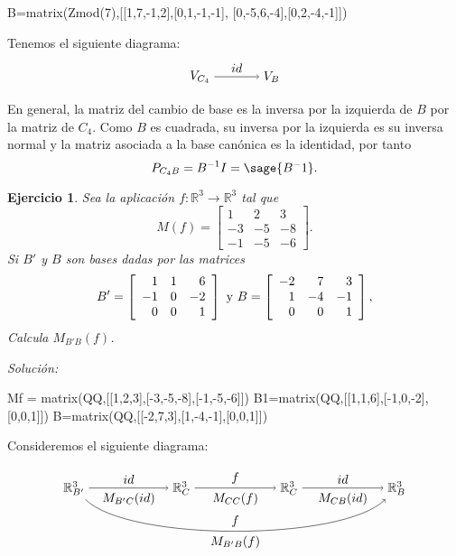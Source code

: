 \documentclass{amsart}
\newtheorem{ejer}{Ejercicio}
\def\r{\mathbb{R}}
\begin{document}
\begin{sageblock}
B=matrix(Zmod(7),[[1,7,-1,2],[0,1,-1,-1],
[0,-5,6,-4],[0,2,-4,-1]])
\end{sageblock}

Tenemos el siguiente diagrama:
$$
\begin{tikzpicture}
\node (VC) at (0,0) {$V_{C_4}$};
\node (VB) at (2,0) {$V_B$};
\draw[->] (VC) to node [above] {$id$} (VB);
\end{tikzpicture}
$$

En general, la matriz del cambio de base es la inversa por la izquierda de
$B$ por la matriz de $C_4$. Como $B$ es cuadrada, su inversa por la izquierda
es su inversa normal y la matriz asociada a la base canónica es la identidad,
por tanto $$P_{C_4B} = B^{-1} I = \sage{B^-1}.$$



\begin{ejer} Sea la aplicación $f: \r ^3\to \r ^3$ tal que 
\[ M(f) = \left[ \begin{array}{rrr} 1 & 2 & 3\\ -3 & -5 & -8\\ 
-1 & -5 & -6 \end{array} \right]. \] Si $B'$ y $B$ son bases 
dadas por las matrices 
\[ B' = \left[ \begin{array}{rrr} 1 & 1 & 6\\ -1 & 0 & -2\\ 
0 & 0 & 1 \end{array} \right] \ \hbox{y} \ B = 
\left[ \begin{array}{rrr} -2 & 7 & 3\\ 1 & -4 & -1\\ 
0 & 0 & 1 \end{array} \right],  \] Calcula $M_{B'B}(f)$.
\end{ejer}

{\it Soluci\'on:}

\begin{sageblock}
Mf = matrix(QQ,[[1,2,3],[-3,-5,-8],[-1,-5,-6]])
B1=matrix(QQ,[[1,1,6],[-1,0,-2],[0,0,1]])
B=matrix(QQ,[[-2,7,3],[1,-4,-1],[0,0,1]])
\end{sageblock}

Consideremos el siguiente diagrama:

$$
\begin{tikzpicture}[xscale = 1.5]
\node (RBp) at (0,0) {$\r^3_{B'}$};
\node (RCa) at (2,0) {$\r^3_C$};
\node (RCb) at (4,0) {$\r^3_C$};
\node (RB)  at (6,0) {$\r^3_B$};
\draw[->] (RBp) to node [above] {$id$} 
                   node [below] {$M_{B'C}(id)$} (RCa);
\draw[->] (RCa) to node [above] {$f$} node [below] {$M_{CC}(f)$} (RCb); 
\draw[->] (RCb) to node [above] {$id$} node [below] {$M_{CB}(id)$} (RB);
\draw[->] (RBp) .. controls (1,-1.5) and (5,-1.5) .. 
                   node [above] {$f$} 
                   node [below] {$M_{B'B}(f)$} (RB);
\end{tikzpicture}
$$
\end{document}
